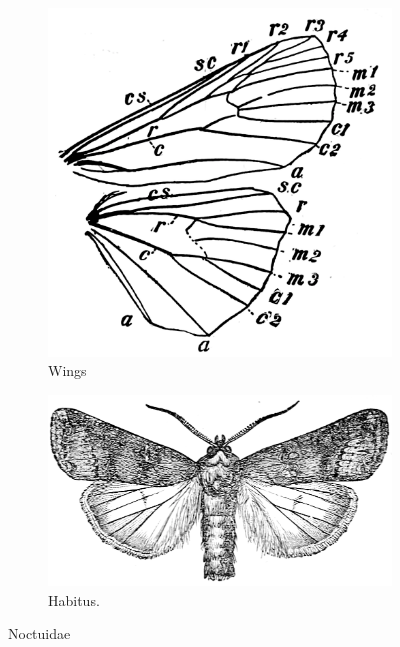 \documentclass[letterpaper, 11pt]{article}
\begin{document}
\begin{figure}[ht!]
    \centering
    \begin{subfigure}[ht!]{0.37\textwidth}
        \includegraphics[width=\textwidth]{NoctuidWings}
        \caption{Wings \citep[][Fig. 445]{bhl83152}}
        \label{fig:noctuid1}
    \end{subfigure}
    \qquad
    \begin{subfigure}[ht!]{0.5\textwidth}
        \includegraphics[width=\textwidth]{noctuidHab.png}
        \caption{Habitus. \citep[Modified from Fig. 14 in][]{bhlitem128144}}
        \label{fig:noctuid2}
    \end{subfigure}
    \caption{Noctuidae}\label{fig:noctuids}
\end{figure}
\end{document}
